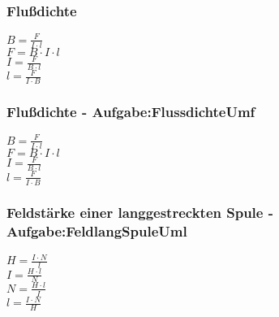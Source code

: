 \subsubsection{Flußdichte} 
\begin{minipage}{0.45\textwidth} 
$ B = \frac{ F}{I\cdot l} $\\ 
$ F = B\cdot I\cdot l $\\ 
$ I = \frac{ F}{B\cdot l} $\\ 
$ l = \frac{ F}{I\cdot B} $\\ 
\end{minipage} 
\begin{minipage}{0.45\textwidth} 
 
\end{minipage} 
\subsubsection{Flußdichte - Aufgabe:FlussdichteUmf} 
\begin{minipage}{0.45\textwidth} 
$ B = \frac{ F}{I\cdot l} $\\ 
$ F = B\cdot I\cdot l $\\ 
$ I = \frac{ F}{B\cdot l} $\\ 
$ l = \frac{ F}{I\cdot B} $\\ 
\end{minipage} 
\begin{minipage}{0.45\textwidth} 
 
\end{minipage} 
\subsubsection{Feldstärke einer langgestreckten Spule - Aufgabe:FeldlangSpuleUml} 
\begin{minipage}{0.45\textwidth} 
$ H = \frac{I\cdot N}{ l} $\\ 
$ I = \frac{H\cdot l}{ N} $\\ 
$ N = \frac{H\cdot l}{ I} $\\ 
$ l = \frac{I\cdot N}{ H} $\\ 
\end{minipage} 
\begin{minipage}{0.45\textwidth} 
 
\end{minipage} 
